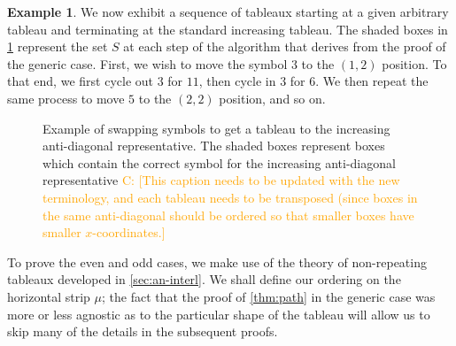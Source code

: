 \documentclass[11pt,reqno]{amsart}
\newcommand{\caelan}[1]{\textcolor{orange}{\sf C: [#1]}}
\theoremstyle{definition}
\theoremstyle{problem}
\newtheorem{example}[definition]{Example}
\theoremstyle{plain}
\theoremstyle{remark}
\theoremstyle{theorem}
\numberwithin{equation}{section}
\numberwithin{figure}{section}
\begin{document}
\begin{example}\label{ex:2}
  We now exhibit a sequence of tableaux starting at a given arbitrary
  tableau and terminating at the standard increasing tableau. The
  shaded boxes in \cref{fig:4} represent the set $S$ at each step of
  the algorithm that derives from the proof of the generic
  case. First, we wish to move the symbol $3$ to the $(1,2)$
  position. To that end, we first cycle out $3$ for $11$, then cycle
  in $3$ for $6$. We then repeat the same process to move $5$ to the
  $(2,2)$ position, and so on.
  \begin{figure}[H]
    
    \caption{Example of swapping symbols to get a tableau to the
      increasing anti-diagonal representative. The shaded boxes
      represent boxes which contain the correct symbol for the
      increasing anti-diagonal representative \caelan{This caption
        needs to be updated with the new terminology, and each tableau
        needs to be transposed (since boxes in the same anti-diagonal
        should be ordered so that smaller boxes have smaller
        $x$-coordinates.}}
  \label{fig:4}
  \end{figure}
\end{example}

To prove the even and odd cases, we make use of the theory of
non-repeating tableaux developed in \cref{sec:an-interl}.  We shall
define our ordering on the horizontal strip $\mu$; the fact that the
proof of \cref{thm:path} in the generic case was more or less agnostic
as to the particular shape of the tableau will allow us to skip many
of the details in the subsequent proofs.
\end{document}
